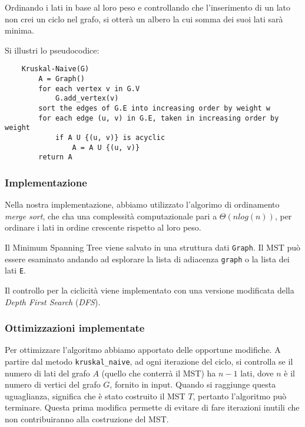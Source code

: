 Ordinando i lati in base al loro peso e controllando che l'inserimento
di un lato non crei un ciclo nel grafo, si otterà un albero la cui
somma dei suoi lati sarà minima.

Si illustri lo pseudocodice:
\begin{verbatim}
    Kruskal-Naive(G)
        A = Graph()
        for each vertex v in G.V
            G.add_vertex(v)
        sort the edges of G.E into increasing order by weight w
        for each edge (u, v) in G.E, taken in increasing order by weight
            if A U {(u, v)} is acyclic
                A = A U {(u, v)}
        return A
\end{verbatim}

\subsubsection{Implementazione}

Nella nostra implementazione, abbiamo utilizzato l'algorimo di
ordinamento \textit{merge sort}, che cha una complessità
computazionale pari a $\Theta(n log(n))$, per ordinare i lati
in ordine crescente rispetto al loro peso.

Il Minimum Spanning Tree viene salvato in una struttura dati
\verb|Graph|. Il MST può essere esaminato andando ad
esplorare la lista di adiacenza \verb|graph| o la lista dei
lati \verb|E|.

Il controllo per la ciclicità viene implementato con una
versione modificata della \textit{Depth First Search}
(\textit{DFS}).

\subsubsection{Ottimizzazioni implementate}

Per ottimizzare l'algoritmo abbiamo apportato delle opportune
modifiche. A partire dal metodo \verb|kruskal_naive|, ad
ogni iterazione del ciclo, si controlla se il numero di lati
del grafo $A$ (quello che conterrà il MST) ha $n - 1$ lati,
dove $n$ è il numero di vertici del grafo $G$, fornito in input.
Quando si raggiunge questa uguaglianza, significa che è stato
costruito il MST $T$, pertanto l'algoritmo può terminare.
Questa prima modifica permette di evitare di fare iterazioni
inutili che non contribuiranno alla costruzione del MST.

